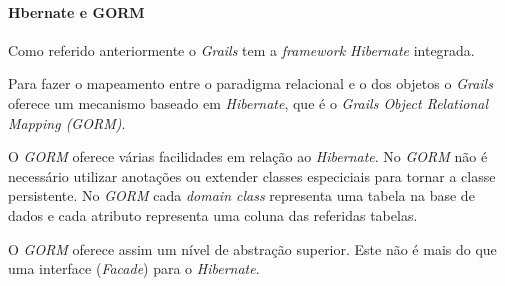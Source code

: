 \paragraph{Hbernate e GORM}

  Como referido anteriormente o \textit{Grails} tem a \textit{framework Hibernate} integrada.

  Para fazer o mapeamento entre o paradigma relacional e o dos objetos o \textit{Grails} oferece um mecanismo baseado em \textit{Hibernate}, que é o \textit{Grails Object Relational Mapping (GORM)}.

  O \textit{GORM} oferece várias facilidades em relação ao \textit{Hibernate}. No \textit{GORM} não é necessário utilizar anotações ou extender classes especiciais para tornar a classe persistente. No \textit{GORM} cada \textit{domain class} representa uma tabela na base de dados e cada atributo representa uma coluna das referidas tabelas.

  O \textit{GORM} oferece assim um nível de abstração superior. Este não é mais do que uma interface (\textit{Facade}) para o \textit{Hibernate}.
